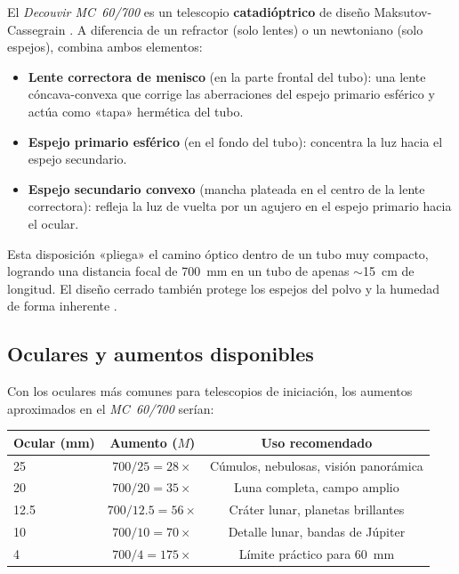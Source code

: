 \documentclass[12pt,oneside]{book}
\begin{document}
El \textit{Decouvir MC~60/700} es un telescopio \textbf{catadióptrico} de diseño
Maksutov-Cassegrain \cite{rutten1988}. A diferencia de un refractor (solo lentes)
o un newtoniano (solo espejos), combina ambos elementos:

\begin{itemize}[leftmargin=1.5em]
    \item \textbf{Lente correctora de menisco} (en la parte frontal del tubo):
          una lente cóncava-convexa que corrige las aberraciones del espejo primario
          esférico y actúa como «tapa» hermética del tubo.
    \item \textbf{Espejo primario esférico} (en el fondo del tubo): concentra la luz
          hacia el espejo secundario.
    \item \textbf{Espejo secundario convexo} (mancha plateada en el centro de la
          lente correctora): refleja la luz de vuelta por un agujero en el espejo
          primario hacia el ocular.
\end{itemize}

Esta disposición «pliega» el camino óptico dentro de un tubo muy compacto,
logrando una distancia focal de 700~mm en un tubo de apenas $\sim$15~cm de
longitud. El diseño cerrado también protege los espejos del polvo y la humedad
de forma inherente \cite{tonkin2007}.

\subsection{Oculares y aumentos disponibles}

Con los oculares más comunes para telescopios de iniciación, los aumentos
aproximados en el \textit{MC~60/700} serían:

\begin{center}
\begin{tabular}{lcc}
\hline
\textbf{Ocular (mm)} & \textbf{Aumento ($M$)} & \textbf{Uso recomendado} \\
\hline
25 & $700/25 = 28\times$ & Cúmulos, nebulosas, visión panorámica \\
20 & $700/20 = 35\times$ & Luna completa, campo amplio \\
12.5 & $700/12.5 = 56\times$ & Cráter lunar, planetas brillantes \\
10  & $700/10 = 70\times$ & Detalle lunar, bandas de Júpiter \\
4   & $700/4 = 175\times$ & Límite práctico para 60~mm \\
\hline
\end{tabular}
\end{center}
\end{document}
